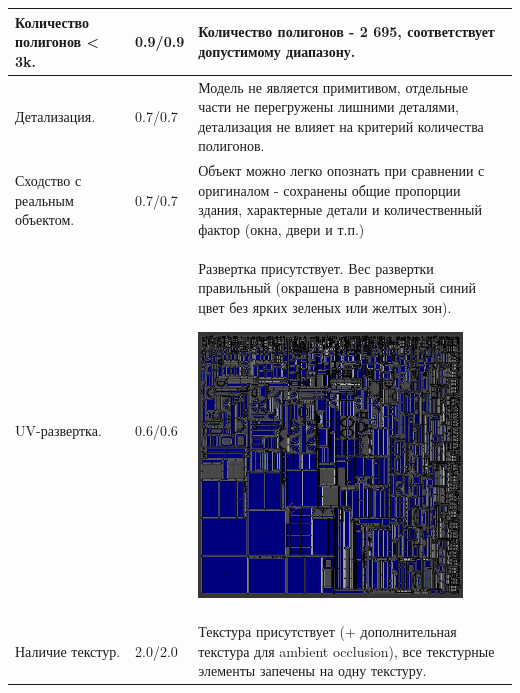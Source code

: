 \begin{longtable}{|p{4cm}|p{2.5cm}|p{7.5cm}|}
    \hline
    Количество полигонов < 3k. & 0.9/0.9 & Количество полигонов - 2 695, соответствует допустимому диапазону. \\
    \hline
    Детализация. & 0.7/0.7 & Модель не является примитивом, отдельные части не перегружены лишними деталями, детализация не влияет на критерий количества полигонов. \\
    \hline
    Сходство с реальным объектом. & 0.7/0.7 & Объект можно легко опознать при сравнении с оригиналом - сохранены общие пропорции здания, характерные детали и количественный фактор (окна, двери и т.п.) \\
    \hline
    UV-развертка. & 0.6/0.6 & Развертка присутствует. Вес развертки правильный (окрашена в равномерный синий цвет без ярких зеленых или желтых зон).

    \includegraphics[width=7cm]{src/uv_1} \\
    \hline
    Наличие текстур. & 2.0/2.0 & Текстура присутствует (+ дополнительная текстура для ambient occlusion), все текстурные элементы запечены на одну текстуру.


\end{longtable}
